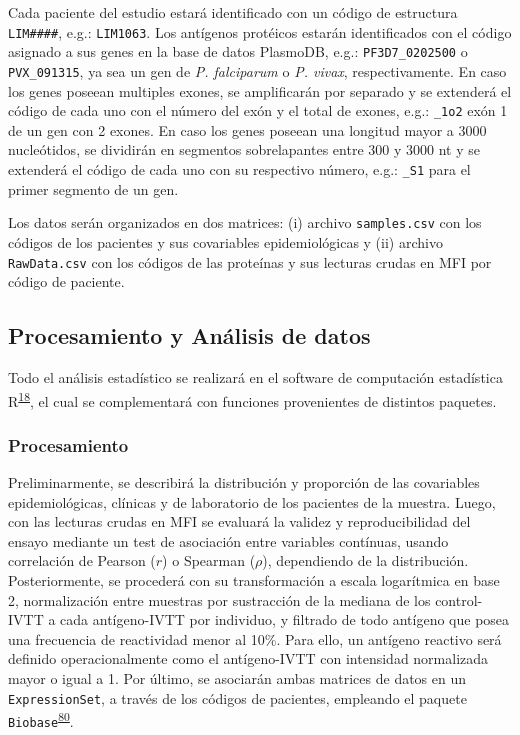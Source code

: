 \documentclass[]{article}
\begin{document}
Cada paciente del estudio estará identificado con un código de
estructura \texttt{LIM\#\#\#\#}, e.g.: \texttt{LIM1063}. Los antígenos
protéicos estarán identificados con el código asignado a sus genes en la
base de datos PlasmoDB, e.g.: \texttt{PF3D7\_0202500} o
\texttt{PVX\_091315}, ya sea un gen de \emph{P. falciparum} o \emph{P.
vivax}, respectivamente. En caso los genes poseean multiples exones, se
amplificarán por separado y se extenderá el código de cada uno con el
número del exón y el total de exones, e.g.: \texttt{\_1o2} exón 1 de un
gen con 2 exones. En caso los genes poseean una longitud mayor a 3000
nucleótidos, se dividirán en segmentos sobrelapantes entre 300 y 3000 nt
y se extenderá el código de cada uno con su respectivo número, e.g.:
\texttt{\_S1} para el primer segmento de un gen.

Los datos serán organizados en dos matrices: (i) archivo
\texttt{samples.csv} con los códigos de los pacientes y sus covariables
epidemiológicas y (ii) archivo \texttt{RawData.csv} con los códigos de
las proteínas y sus lecturas crudas en MFI por código de paciente.

\hypertarget{procanal}{\subsection{Procesamiento y Análisis de
datos}\label{procanal}}

Todo el análisis estadístico se realizará en el software de computación
estadística R\textsuperscript{\protect\hyperlink{ref-R}{18}}, el cual se
complementará con funciones provenientes de distintos paquetes.

\subsubsection{Procesamiento}\label{procesamiento}

Preliminarmente, se describirá la distribución y proporción de las
covariables epidemiológicas, clínicas y de laboratorio de los pacientes
de la muestra. Luego, con las lecturas crudas en MFI se evaluará la
validez y reproducibilidad del ensayo mediante un test de asociación
entre variables contínuas, usando correlación de Pearson (\(r\)) o
Spearman (\(\rho\)), dependiendo de la distribución. Posteriormente, se
procederá con su transformación a escala logarítmica en base 2,
normalización entre muestras por sustracción de la mediana de los
control-IVTT a cada antígeno-IVTT por individuo, y filtrado de todo
antígeno que posea una frecuencia de reactividad menor al 10\%. Para
ello, un antígeno reactivo será definido operacionalmente como el
antígeno-IVTT con intensidad normalizada mayor o igual a 1. Por último,
se asociarán ambas matrices de datos en un \texttt{ExpressionSet}, a
través de los códigos de pacientes, empleando el paquete
\texttt{Biobase}\textsuperscript{\protect\hyperlink{ref-Biobase}{80}}.
\end{document}
